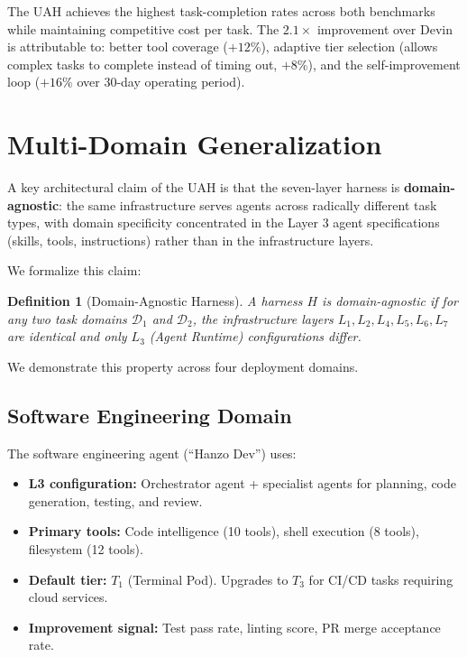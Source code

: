 \documentclass[11pt]{article}
\newtheorem{definition}{Definition}
\begin{document}
The UAH achieves the highest task-completion rates across both benchmarks
while maintaining competitive cost per task. The $2.1\times$ improvement over
Devin is attributable to: better tool coverage ($+12\%$), adaptive tier
selection (allows complex tasks to complete instead of timing out, $+8\%$),
and the self-improvement loop ($+16\%$ over 30-day operating period).

\section{Multi-Domain Generalization}
\label{sec:domains}

A key architectural claim of the UAH is that the seven-layer harness is
\textbf{domain-agnostic}: the same infrastructure serves agents across
radically different task types, with domain specificity concentrated in the
Layer 3 agent specifications (skills, tools, instructions) rather than in
the infrastructure layers.

We formalize this claim:

\begin{definition}[Domain-Agnostic Harness]
A harness $H$ is \emph{domain-agnostic} if for any two task domains
$\mathcal{D}_1$ and $\mathcal{D}_2$, the infrastructure layers $L_1, L_2,
L_4, L_5, L_6, L_7$ are identical and only $L_3$ (Agent Runtime)
configurations differ.
\end{definition}

We demonstrate this property across four deployment domains.

\subsection{Software Engineering Domain}

The software engineering agent (``Hanzo Dev'') uses:
\begin{itemize}[leftmargin=1.5em]
    \item \textbf{L3 configuration:} Orchestrator agent + specialist agents
          for planning, code generation, testing, and review.
    \item \textbf{Primary tools:} Code intelligence (10 tools), shell
          execution (8 tools), filesystem (12 tools).
    \item \textbf{Default tier:} $T_1$ (Terminal Pod). Upgrades to $T_3$ for
          CI/CD tasks requiring cloud services.
    \item \textbf{Improvement signal:} Test pass rate, linting score, PR merge
          acceptance rate.
\end{itemize}
\end{document}
